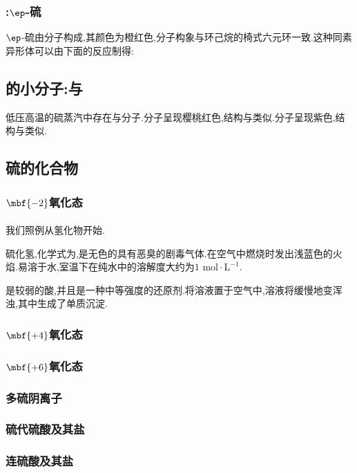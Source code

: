 \documentclass{ctexart}
\begin{document}
\subsubsection{:$\ep$-硫}
$\ep$-硫由分子构成,其颜色为橙红色,分子构象与环己烷的椅式六元环一致.这种同素异形体可以由下面的反应制得:
\begin{center}
\end{center}
\subsection{的小分子:与}
低压高温的硫蒸汽中存在与分子.分子呈现樱桃红色,结构与类似.分子呈现紫色,结构与类似.
\subsection{硫的化合物}
\subsubsection{$\mbf{-2}$氧化态}
\paragraph{}
我们照例从氢化物开始.
\begin{substance}[\ce{H2S}]
    硫化氢,化学式为,是无色的具有恶臭的剧毒气体.在空气中燃烧时发出浅蓝色的火焰.易溶于水,室温下在纯水中的溶解度大约为$1\text{ mol}\cdot\text{L}^{-1}$.
\end{substance}
是较弱的酸,并且是一种中等强度的还原剂.将溶液置于空气中,溶液将缓慢地变浑浊,其中生成了单质沉淀.
\subsubsection{$\mbf{+4}$氧化态}
\subsubsection{$\mbf{+6}$氧化态}
\subsubsection{多硫阴离子}
\subsubsection{硫代硫酸及其盐}
\subsubsection{连硫酸及其盐}
\end{document}

